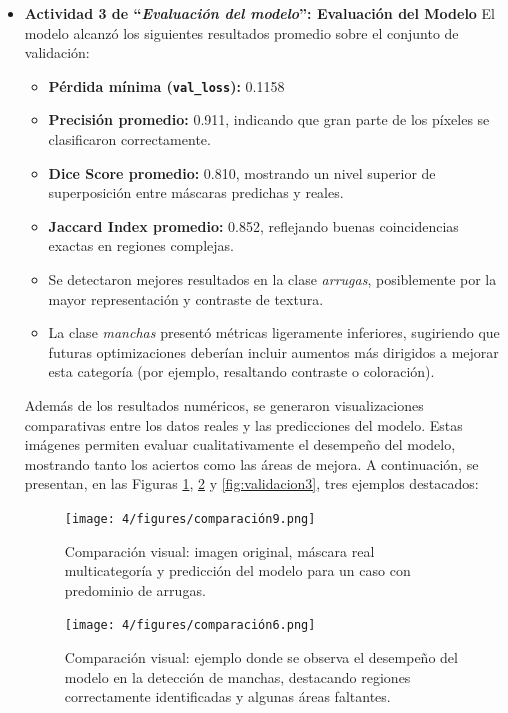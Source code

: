 \begin{enumerate}
\begin{itemize}
  \item\textbf{Actividad 3 de “\textit{Evaluación del modelo}”: Evaluación del Modelo}
  El modelo alcanzó los siguientes resultados promedio sobre el conjunto de validación:
\begin{itemize}
  \item \textbf{Pérdida mínima (\texttt{val\_loss}):} 0.1158
  \item \textbf{Precisión promedio:} 0.911, indicando que gran parte de los píxeles se clasificaron correctamente.
  \item \textbf{Dice Score promedio:} 0.810, mostrando un nivel superior de superposición entre máscaras predichas y reales.
  \item \textbf{Jaccard Index promedio:} 0.852, reflejando buenas coincidencias exactas en regiones complejas.
  \item Se detectaron mejores resultados en la clase \emph{arrugas}, posiblemente por la mayor representación y contraste de textura.
  \item La clase \emph{manchas} presentó métricas ligeramente inferiores, sugiriendo que futuras optimizaciones deberían incluir aumentos más dirigidos a mejorar esta categoría (por ejemplo, resaltando contraste o coloración).
\end{itemize}

\vspace{0.5cm}

Además de los resultados numéricos, se generaron visualizaciones comparativas entre los datos reales y las predicciones del modelo. Estas imágenes permiten evaluar cualitativamente el desempeño del modelo, mostrando tanto los aciertos como las áreas de mejora. A continuación, se presentan, en las Figuras \ref{fig:validacion1}, \ref{fig:validacion2} y \ref{fig:validacion3}, tres ejemplos destacados:

\vspace{0.5cm}

\begin{figure}[H]
\centering
\texttt{[image: 4/figures/comparación9.png]}
\caption{Comparación visual: imagen original, máscara real multicategoría y predicción del modelo para un caso con predominio de arrugas.}
\label{fig:validacion1}
\end{figure}

\begin{figure}[H]
\centering
\texttt{[image: 4/figures/comparación6.png]}
\caption{Comparación visual: ejemplo donde se observa el desempeño del modelo en la detección de manchas, destacando regiones correctamente identificadas y algunas áreas faltantes.}
\label{fig:validacion2}
\end{figure}


\end{itemize}
\end{enumerate}
